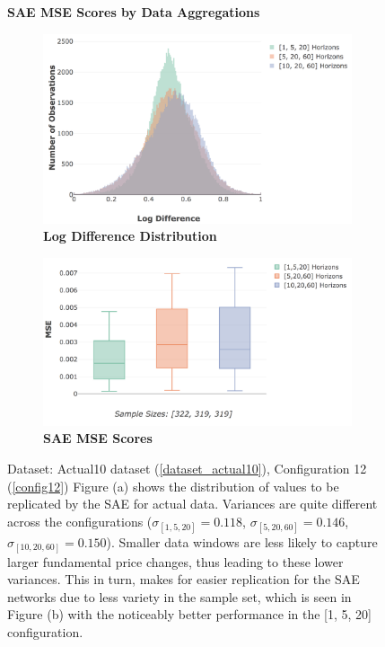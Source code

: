 \documentclass[a4paper,11pt,oneside]{article}
\theoremstyle{plain}
\theoremstyle{definition}
\begin{document}
	
	\begin{figure}[H]
		\centering
		\textbf{SAE MSE Scores by Data Aggregations}
		\begin{subfigure}{.99\textwidth}
			\centering 
			\includegraphics[scale=0.45]{images/results/8_2_determinants/actual_aggregate_dist.png}
			\caption{\textbf{Log Difference Distribution}
				\newline }
			\label{figure-actual_aggregate_dist}
		\end{subfigure}
		\begin{subfigure}{.99\textwidth}
			\centering 
			\includegraphics[scale=0.45]{images/results/8_2_determinants/actual_aggregation_mse.png}
			\caption{\textbf{SAE MSE Scores} 
				\newline }
			\label{figure-actual_aggregation_mse}
		\end{subfigure}
		\caption[SAE MSE Scores by Data Aggregations]
		{Dataset: Actual10 dataset (\ref{dataset_actual10}), Configuration 12 (\ref{config12})
			\newline  Figure (a) shows the distribution of values to be replicated by the SAE for actual data. Variances are quite different across the configurations ($\sigma_{[1,5,20]} = 0.118$, $\sigma_{[5,20,60]} = 0.146$, $\sigma_{[10,20,60]} = 0.150$). Smaller data windows are less likely to capture larger fundamental price changes, thus leading to these lower variances. This in turn, makes for easier replication for the SAE networks due to less variety in the sample set, which is seen in Figure (b) with the noticeably better performance in the [1, 5, 20] configuration.}
		\label{fig_data_sae_actual}
	\end{figure}
	
\end{document}
